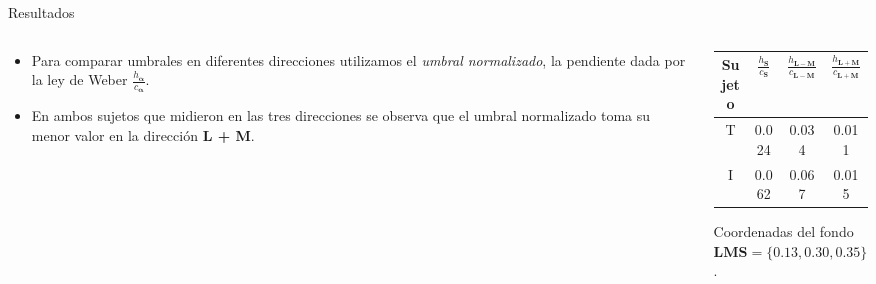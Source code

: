 \documentclass[
    11pt, %
    aspectratio=169, %
]{beamer}
\begin{document}
\begin{frame}{Resultados}
    \begin{columns}[c] %

    
		\begin{column}{0.50\textwidth}

    \begin{itemize}
        \item Para comparar umbrales en diferentes direcciones utilizamos el \textit{umbral normalizado}, la pendiente dada por la ley de Weber $\frac{h_\mathbf{\alpha}}{c_\mathbf{\alpha}}$. 
        \item En ambos sujetos que midieron en las tres direcciones se observa que el umbral normalizado toma su menor valor en la dirección \textbf{L + M}.
      
    \end{itemize}

                
		\end{column}
  		\begin{column}{0.50\textwidth} %
                \begin{table}[h]
    \centering
    \begin{tabular}{cccc}
        \hline
        Sujeto &  $\frac{h_\mathbf{S}}{c_\mathbf{S}}$& $\frac{h_\mathbf{L - M}}{c_\mathbf{L - M}}$ & $\frac{h_\mathbf{L + M}}{c_\mathbf{L + M}}$\\
        \hline
        T & 0.024 & 0.034  & 0.011 \\ 
        I & 0.062 & 0.067 & 0.015\\
    \end{tabular}
\end{table}

\makebox[2.0cm]{}Coordenadas del fondo \\ 
\makebox[2.0cm]{}$\mathbf{LMS} = \{0.13,0.30,0.35\}$.
		\end{column}		
	\end{columns}
\end{frame}
\end{document}
